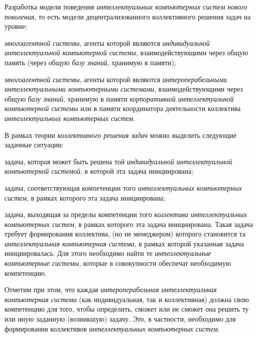 \begin{textitemize}
	\item Разработка модели  поведения \textit{интеллектуальных компьютерных систем нового поколения}, то есть модели децентрализованного коллективного решения задач на уровне:
	\begin{textitemize}
		\item \textit{многоагентной системы}, агенты которой являются  \textit{индивидуальной интеллектуальной компьютерной системы}, взаимодействующими через общую память (через общую \textit{базу знаний}, хранимую в  памяти);
		\item \textit{многоагентной системы}, агенты которой являются \textit{интероперабельными интеллектуальными компьютерными системами}, взаимодействующими через общую \textit{базу знаний}, хранимую в памяти \textit{корпоративной интеллектуальной компьютерной системы} или в памяти координатора деятельности  коллектива \textit{интеллектуальных компьютерных систем}. 
	\end{textitemize}
	В рамках теории \textit{коллективного решения задач} можно выделить следующие задачные ситуации:
	\begin{textitemize}
		\item задача, которая может быть решена той \textit{индивидуальной интеллектуальной компьютерной системой}, в которой эта задача инициирована;
		\item задача, соответствующая компетенции того \textit{ интеллектуальных компьютерных систем}, в рамках которого эта задача инициирована;
		\item задача, выходящая за пределы компетенции того \textit{коллектива интеллектуальных компьютерных систем}, в рамках которого эта задача инициирована. Такая задача требует формирования  коллектива,  (но не менеджером) которого становится та \textit{интеллектуальная компьютерная система}, в рамках которой указанная задача инициировалась. Для этого необходимо найти те \textit{интеллектуальные компьютерные системы}, которые в совокупности обеспечат необходимую компетенцию.
	\end{textitemize}
	Отметим при этом, что каждая \textit{интероперабельная интеллектуальная компьютерная система} (как индивидуальная, так и коллективная) должна  свою компетенцию для того, чтобы определить, сможет или не сможет она решить ту или иную заданную (возникшую) задачу. Это, в частности, необходимо для формирования  коллективов \textit{интеллектуальных компьютерных систем}.
	

\end{textitemize}
